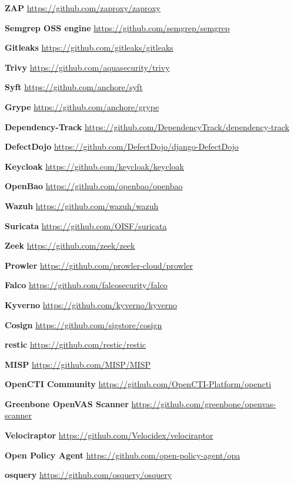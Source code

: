 \documentclass[11pt,oneside]{report}
\begin{document}
\noindent\textbf{ZAP} \hfill \url{https://github.com/zaproxy/zaproxy}\par
\noindent\textbf{Semgrep OSS engine} \hfill \url{https://github.com/semgrep/semgrep}\par
\noindent\textbf{Gitleaks} \hfill \url{https://github.com/gitleaks/gitleaks}\par
\noindent\textbf{Trivy} \hfill \url{https://github.com/aquasecurity/trivy}\par
\noindent\textbf{Syft} \hfill \url{https://github.com/anchore/syft}\par
\noindent\textbf{Grype} \hfill \url{https://github.com/anchore/grype}\par
\noindent\textbf{Dependency-Track} \hfill \url{https://github.com/DependencyTrack/dependency-track}\par
\noindent\textbf{DefectDojo} \hfill \url{https://github.com/DefectDojo/django-DefectDojo}\par
\noindent\textbf{Keycloak} \hfill \url{https://github.com/keycloak/keycloak}\par
\noindent\textbf{OpenBao} \hfill \url{https://github.com/openbao/openbao}\par
\noindent\textbf{Wazuh} \hfill \url{https://github.com/wazuh/wazuh}\par
\noindent\textbf{Suricata} \hfill \url{https://github.com/OISF/suricata}\par
\noindent\textbf{Zeek} \hfill \url{https://github.com/zeek/zeek}\par
\noindent\textbf{Prowler} \hfill \url{https://github.com/prowler-cloud/prowler}\par
\noindent\textbf{Falco} \hfill \url{https://github.com/falcosecurity/falco}\par
\noindent\textbf{Kyverno} \hfill \url{https://github.com/kyverno/kyverno}\par
\noindent\textbf{Cosign} \hfill \url{https://github.com/sigstore/cosign}\par
\noindent\textbf{restic} \hfill \url{https://github.com/restic/restic}\par
\noindent\textbf{MISP} \hfill \url{https://github.com/MISP/MISP}\par
\noindent\textbf{OpenCTI Community} \hfill \url{https://github.com/OpenCTI-Platform/opencti}\par
\noindent\textbf{Greenbone OpenVAS Scanner} \hfill \url{https://github.com/greenbone/openvas-scanner}\par
\noindent\textbf{Velociraptor} \hfill \url{https://github.com/Velocidex/velociraptor}\par
\noindent\textbf{Open Policy Agent} \hfill \url{https://github.com/open-policy-agent/opa}\par
\noindent\textbf{osquery} \hfill \url{https://github.com/osquery/osquery}\par
\end{document}
